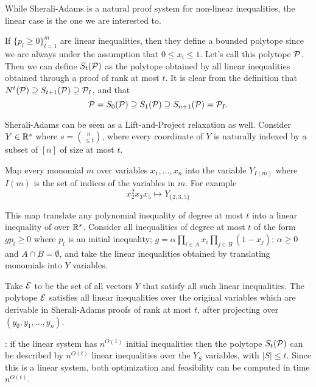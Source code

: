 \documentclass[a4paper,twoside,justified]{tufte-handout}
\begin{document}
While Sherali-Adams is a natural proof system for non-linear
inequalities, the linear case is the one we are interested to.

If $ \{p_{l}\geq 0\}^{m}_{l=1} $ are linear inequalities, then they
define a bounded polytope since we are always under the assumption
that $0\leq x_{i}\leq 1 $. Let's call this polytope $ \mathcal{P} $. Then
we can define $ S_{t}(\mathcal{P}) $ as the polytope obtained by all
linear inequalities obtained through a proof of rank at most $ t $. It
is clear from the definition that $ N^{t}(\mathcal{P}) \supseteq
S_{t+1}(\mathcal{P}) \supseteq \mathcal{P}_{I} $, and that
\begin{equation}
  \mathcal{P}=S_{0}(\mathcal{P}) \supseteq S_{1}(\mathcal{P}) \supseteq
  S_{n+1}(\mathcal{P}) = \mathcal{P}_{I}.
\end{equation}


Sherali-Adams can be seen as a Lift-and-Project relaxation as
well. Consider $ Y\in \mathbb{R}^{s} $ where $ s=\binom{n}{\leq t} $,
where every coordinate of $ Y $ is naturally indexed by a subset
of $ [n] $ of size at most $ t $.

Map every monomial $m$ over variables $ x_{1}, \ldots, x_{n} $ into the variable $
Y_{I(m)}$ where $ I(m) $ is the set of indices of the variables in $ m
$.  For example
\begin{equation*}
x^{2}_{2} x_{3}x_{5} \mapsto Y_{\{2,3,5\}} 
\end{equation*}

This map translate any polynomial inequality of degree at most $ t $
into a linear inequality of over $ \mathbb{R}^{s} $. Consider all
inequalities of degree at most $t$ of the form $ g p_{l}\geq 0 $ where
$ p_{l} $ is an initial inequality; $ g = \alpha \prod_{i\in A} x_{i}
\prod_{j \in B}(1-x_{j}) $; $ \alpha\geq 0 $ and $ A\cap B=\emptyset
$, and take the linear inequalities obtained by translating monomials
into $Y$ variables.

Take $ \mathcal{E} $ to be the set of all vectors $ Y $ that satisfy all
such linear inequalities. The polytope $ \mathcal{E} $ satisfies all
linear inequalities over the original variables which are derivable in
Sherali-Adams proofs of rank at most $ t $, after projecting over $
(y_{\emptyset},y_{1},\ldots,y_{n})$.


: if the linear system has $ n^{O(1)} $
initial inequalities then the polytope $ S_{t}(\mathcal{P}) $ can be
described by $ n^{O(t)} $ linear inequalities over the $ Y_{S} $
variables, with $ |S|\leq t $. Since this is a linear system, both
optimization and feasibility can be computed in time $ n^{O(t)} $.
\end{document}
